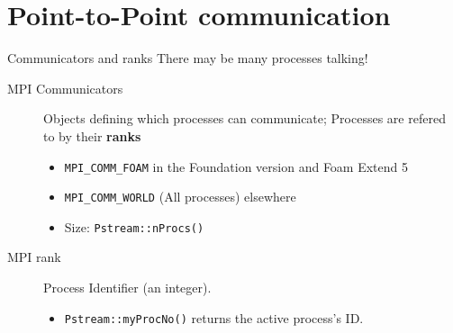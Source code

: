\section{Point-to-Point communication}

\begin{frame}[fragile]{Communicators and ranks}
    There may be many processes talking!
    \begin{description}
        \item[MPI Communicators] \hspace{\linewidth} Objects defining which processes can communicate;
            Processes are refered to by  their {\bf ranks}
        \begin{itemize}
            \item \verb|MPI_COMM_FOAM| in the Foundation version and Foam Extend 5
            \item \verb|MPI_COMM_WORLD| (All processes) elsewhere
            \item Size: \verb|Pstream::nProcs()|
        \end{itemize}
    \item[MPI rank \hspace{1.9cm}] \hspace{\linewidth} Process Identifier (an integer).
        \begin{itemize}
            \item \verb|Pstream::myProcNo()| returns the active process's ID.
        \end{itemize}
    \end{description}
\end{frame}


